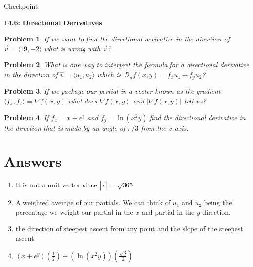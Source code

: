 \documentclass[11pt]{article}
\newtheorem{problem}{Problem}
\newcommand{\vs}{\vspace*{.1in}}
\begin{document}
\begin{huge}
    \begin{center}
        Checkpoint
    \end{center}
\end{huge}
\begin{large}\begin{center}\bf 14.6: Directional Derivatives \end{center}
\end{large}

\vs\vs

\begin{problem}
If we want to find the directional derivative in the direction of $\vec{v} = \langle 19, -2 \rangle$ what is wrong with $\vec{v}$?
\end{problem}

\begin{problem}
What is one way to interpret the formula for a directional derivative in the direction of $\hat{u} = \langle u_1, u_2 \rangle$ which is $\mathcal{D}_{\hat{u}}f(x,y) = f_xu_1+f_yu_2$?
\end{problem}

\begin{problem}
If we package our partial in a vector known as the gradient $\langle f_x, f_x \rangle = \nabla f(x,y)$ what does $\nabla f(x,y)$ and $|\nabla f(x,y)|$ tell us?
\end{problem}


\begin{problem}
If $f_x = x+e^y$ and $f_y = \ln{(x^2y)}$ find the directional derivative in the direction that is made by an angle of $\pi/3$ from the $x$-axis.
\end{problem}





\newpage

\section{Answers}

\begin{enumerate}
    \item It is not a unit vector since $|\vec{v}| = \sqrt{365}$
    \item A weighted average of our partials. We can think of $u_1$ and $u_2$ being the percentage we weight our partial in the $x$ and partial in the $y$ direction.
    \item the direction of steepest ascent from any point and the slope of the steepest ascent.
    \item $(x+e^y)(\frac{1}{2})+(\ln{(x^2y)})(\frac{\sqrt{3}}{2})$
\end{enumerate}
\end{document}
